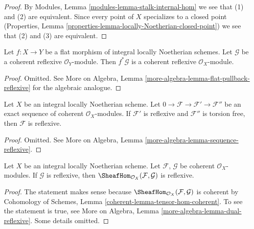 \begin{proof}
By Modules, Lemma \ref{modules-lemma-stalk-internal-hom} we see that
(1) and (2) are equivalent. Since every point of $X$ specializes to
a closed point
(Properties, Lemma \ref{properties-lemma-locally-Noetherian-closed-point})
we see that (2) and (3) are equivalent.
\end{proof}

\begin{lemma}
\label{lemma-flat-pullback-reflexive}
Let $f : X \to Y$ be a flat morphism of integral locally Noetherian schemes.
Let $\mathcal{G}$ be a coherent reflexive $\mathcal{O}_Y$-module.
Then $f^*\mathcal{G}$ is a coherent reflexive $\mathcal{O}_X$-module.
\end{lemma}

\begin{proof}
Omitted. See
More on Algebra, Lemma \ref{more-algebra-lemma-flat-pullback-reflexive}
for the algebraic analogue.
\end{proof}

\begin{lemma}
\label{lemma-sequence-reflexive}
Let $X$ be an integral locally Noetherian scheme.
Let $0 \to \mathcal{F} \to \mathcal{F}' \to \mathcal{F}''$ be
an exact sequence of coherent $\mathcal{O}_X$-modules.
If $\mathcal{F}'$ is reflexive and $\mathcal{F}''$ is torsion free,
then $\mathcal{F}$ is reflexive.
\end{lemma}

\begin{proof}
Omitted. See More on Algebra, Lemma \ref{more-algebra-lemma-sequence-reflexive}.
\end{proof}

\begin{lemma}
\label{lemma-dual-reflexive}
Let $X$ be an integral locally Noetherian scheme.
Let $\mathcal{F}$, $\mathcal{G}$ be
coherent $\mathcal{O}_X$-modules.
If $\mathcal{G}$ is reflexive,
then $\SheafHom_{\mathcal{O}_X}(\mathcal{F}, \mathcal{G})$ is reflexive.
\end{lemma}

\begin{proof}
The statement makes sense because
$\SheafHom_{\mathcal{O}_X}(\mathcal{F}, \mathcal{G})$
is coherent by Cohomology of Schemes, Lemma
\ref{coherent-lemma-tensor-hom-coherent}.
To see the statement is true, see
More on Algebra, Lemma \ref{more-algebra-lemma-dual-reflexive}.
Some details omitted.
\end{proof}

